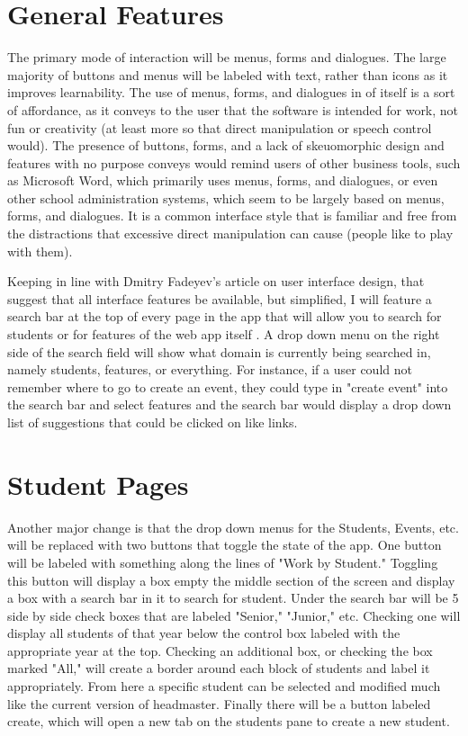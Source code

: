 \documentclass{article}
\begin{document}
\section{General Features}

The primary mode of interaction will be menus, forms and dialogues. The large majority of buttons and menus will be labeled with text, rather than icons as it improves learnability. The use of menus, forms, and dialogues in of itself is a sort of affordance, as it conveys to the user that the software is intended for work, not fun or creativity (at least more so that direct manipulation or speech control would). The presence of buttons, forms, and a lack of skeuomorphic design and features with no purpose conveys would remind users of other business tools, such as Microsoft Word, which primarily uses menus, forms, and dialogues, or even other school administration systems, which seem to be largely based on menus, forms, and dialogues. It is a common interface style that is familiar and free from the distractions that excessive direct manipulation can cause (people like to play with them).

Keeping in line with Dmitry Fadeyev's article on user interface design, that suggest that all interface features be available, but simplified, I will feature a search bar at the top of every page in the app that will allow you to search for students or for features of the web app itself \cite{techniques}. A drop down menu on the right side of the search field will show what domain is currently being searched in, namely students, features, or everything. For instance, if a user could not remember where to go to create an event, they could type in "create event" into the search bar and select features and the search bar would display a drop down list of suggestions that could be clicked on like links. 

\section{Student Pages}
Another major change is that the drop down menus for the Students, Events, etc.  will be replaced with two buttons that toggle the state of the app. One button will be labeled with something along the lines of "Work by Student." Toggling this button will display a box empty the middle section of the screen and display a box with a search bar in it to search for student. Under the search bar will be 5 side by side check boxes that are labeled "Senior," "Junior," etc. Checking one will display all students of that year below the control box labeled with the appropriate year at the top. Checking an additional box, or checking the box marked "All," will create a border around each block of students and label it appropriately. From here a specific student can be selected and modified much like the current version of headmaster. Finally there will be a button labeled create, which will open a new tab on the students pane to create a new student. 
\end{document}

